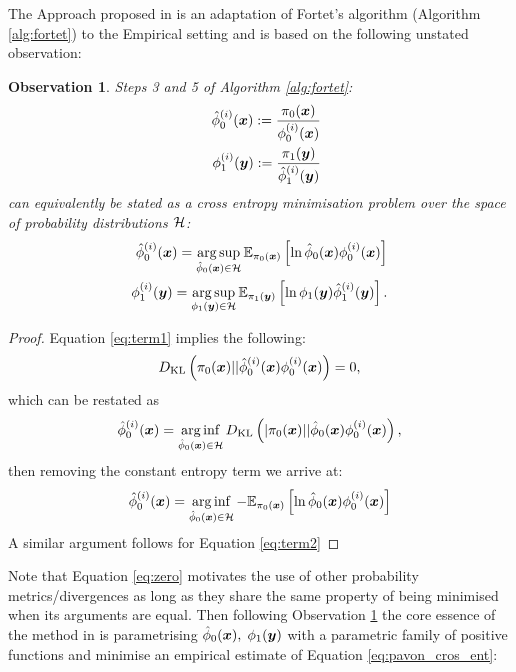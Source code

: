 \documentclass[a4paper,12pt,twoside,openright]{report}
\newtheorem{observation}[theorem]{Observation}
\theoremstyle{definition}
\begin{document}
The Approach proposed in \cite{pavon2018data} is an adaptation of Fortet's algorithm (Algorithm \ref{alg:fortet}) to the Empirical setting and is based on the following unstated observation:
\begin{observation}\label{obs:pavon}
Steps 3 and 5 of Algorithm \ref{alg:fortet}:
\begin{align}
    {\hat{\phi}}_0^{(i)}({\bm{x}}) := \frac{\pi_0({\bm{x}})}{\phi_0^{(i)}({\bm{x}})} \label{eq:term1}\\    \quad \phi_1^{(i)}({\bm{y}}) := \frac{\pi_1({\bm{y}})}{{\hat{\phi}}_1^{(i)}({\bm{y}})}  \label{eq:term2}
\end{align}
can equivalently be stated as a cross entropy minimisation problem over the space of probability distributions ${\mathcal{H}}$:
\begin{align} \label{eq:pavon_cros_ent}
   {\hat{\phi}}_0^{(i)}({\bm{x}})= \operatorname*{arg\,sup}_{{\hat{\phi}}_0({\bm{x}}) \in {\mathcal{H}}} \mathbb{E}_{\pi_0({\bm{x}})} \left[\operatorname{ln} {\hat{\phi}}_0({\bm{x}})   \phi_0^{(i)}({\bm{x}})\right]\\
   \phi_1^{(i)}({\bm{y}})= \operatorname*{arg\,sup}_{\phi_1({\bm{y}}) \in {\mathcal{H}}} \mathbb{E}_{\pi_1({\bm{y}})} \left[\operatorname{ln} \phi_1({\bm{y}})   {\hat{\phi}}_1^{(i)}({\bm{y}})\right].
\end{align}
\end{observation}
\begin{proof}
Equation \ref{eq:term1}  implies the following:
\begin{align}\label{eq:zero}
    D_{\mathrm{KL}}\left(\pi_0({\bm{x}}) || {\hat{\phi}}_0^{(i)}({\bm{x}})   \phi_0^{(i)}({\bm{x}}) \right)  = 0 ,
\end{align} 
which can be restated as
\begin{align}
   {\hat{\phi}}_0^{(i)}({\bm{x}}) = \operatorname*{arg\,inf}_{{\hat{\phi}}_0({\bm{x}})\in \mathcal{H}} D_{\mathrm{KL}}\left(|\pi_0({\bm{x}}) || {\hat{\phi}}_0({\bm{x}})   \phi_0^{(i)}({\bm{x}}) \right),  
\end{align} 
then removing the constant entropy term we arrive at:
\begin{align*}
   {\hat{\phi}}_0^{(i)}({\bm{x}})= \operatorname*{arg\,inf}_{{\hat{\phi}}_0({\bm{x}}) \in {\mathcal{H}}} -\mathbb{E}_{\pi_0({\bm{x}})} \left[\operatorname{ln} {\hat{\phi}}_0({\bm{x}})   \phi_0^{(i)}({\bm{x}})\right]
\end{align*}
A similar argument follows for Equation \ref{eq:term2}
\end{proof}
Note that Equation \ref{eq:zero} motivates the use of other probability metrics/divergences as long as they share the same property of being minimised  when its arguments are equal. Then following Observation \ref{obs:pavon} the core essence of the method in \cite{pavon2018data} is parametrising  ${\hat{\phi}}_0({\bm{x}}), \;  \phi_1({\bm{y}}) $ with a parametric family of positive functions and minimise an empirical estimate of Equation \ref{eq:pavon_cros_ent}:
\end{document}
